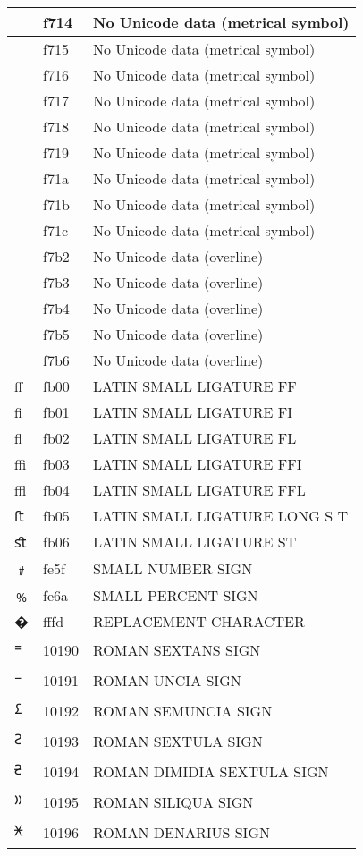 \documentclass[12pt,letterpaper,openany]{book}
\begin{document}
\begin{center}
\begin{supertabular}{|m{0.25in}|m{0.5in}|m{4in}|}
 & f714 & No Unicode data (metrical symbol)\\\hline
 & f715 & No Unicode data (metrical symbol)\\\hline
 & f716 & No Unicode data (metrical symbol)\\\hline
 & f717 & No Unicode data (metrical symbol)\\\hline
 & f718 & No Unicode data (metrical symbol)\\\hline
 & f719 & No Unicode data (metrical symbol)\\\hline
 & f71a & No Unicode data (metrical symbol)\\\hline
 & f71b & No Unicode data (metrical symbol)\\\hline
 & f71c & No Unicode data (metrical symbol)\\\hline
 & f7b2 & No Unicode data (overline)\\\hline
 & f7b3 & No Unicode data (overline)\\\hline
 & f7b4 & No Unicode data (overline)\\\hline
 & f7b5 & No Unicode data (overline)\\\hline
 & f7b6 & No Unicode data (overline)\\\hline
ﬀ & fb00 & LATIN SMALL LIGATURE FF\\\hline
ﬁ & fb01 & LATIN SMALL LIGATURE FI\\\hline
ﬂ & fb02 & LATIN SMALL LIGATURE FL\\\hline
ﬃ & fb03 & LATIN SMALL LIGATURE FFI\\\hline
ﬄ & fb04 & LATIN SMALL LIGATURE FFL\\\hline
ﬅ & fb05 & LATIN SMALL LIGATURE LONG S T\\\hline
ﬆ & fb06 & LATIN SMALL LIGATURE ST\\\hline
﹟ & fe5f & SMALL NUMBER SIGN\\\hline
﹪ & fe6a & SMALL PERCENT SIGN\\\hline
� & fffd & REPLACEMENT CHARACTER\\\hline
𐆐 & 10190 & ROMAN SEXTANS SIGN\\\hline
𐆑 & 10191 & ROMAN UNCIA SIGN\\\hline
𐆒 & 10192 & ROMAN SEMUNCIA SIGN\\\hline
𐆓 & 10193 & ROMAN SEXTULA SIGN\\\hline
𐆔 & 10194 & ROMAN DIMIDIA SEXTULA SIGN\\\hline
𐆕 & 10195 & ROMAN SILIQUA SIGN\\\hline
𐆖 & 10196 & ROMAN DENARIUS SIGN\\\hline

\end{supertabular}
\end{center}
\end{document}
